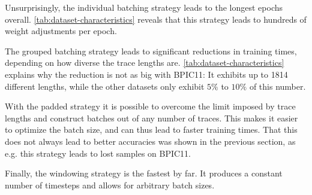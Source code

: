 Unsurprisingly, the individual batching strategy leads to the longest epochs overall. \autoref{tab:dataset-characteristics} reveals that this strategy leads to hundreds of weight adjustments per epoch.

The grouped batching strategy leads to significant reductions in training times, depending on how diverse the trace lengths are. \autoref{tab:dataset-characteristics} explains why the reduction is not as big with BPIC11: It exhibits up to 1814 different lengths, while the other datasets only exhibit $5\%$ to $10\%$ of this number.

With the padded strategy it is possible to overcome the limit imposed by trace lengths and construct batches out of any number of traces. This makes it easier to optimize the batch size, and can thus lead to faster training times. That this does not always lead to better accuracies was shown in the previous section, as e.g. this strategy leads to lost samples on BPIC11.

Finally, the windowing strategy is the fastest by far. It produces a constant number of timesteps and allows for arbitrary batch sizes.

